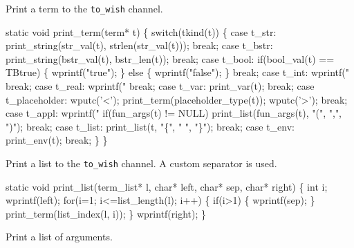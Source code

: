 

Print a term to the {\tt to\_wish} channel.

\nwenddocs{}\endmoddef\let\nwnotused=\nwoutput{}
static void print_term(term* t)
\{
   switch(tkind(t))
   \{
      case t_str:
         print_string(str_val(t), strlen(str_val(t)));
         break;
      case t_bstr:
         print_string(bstr_val(t), bstr_len(t));
         break;
      case t_bool:
         if(bool_val(t) == TBtrue) \{
            wprintf("true");
         \} else \{
            wprintf("false");
         \}
         break;
      case t_int:
         wprintf("%
         break;
      case t_real:
         wprintf("%
         break;
      case t_var:
         print_var(t);
         break;
      case t_placeholder:
         wputc('<');
         print_term(placeholder_type(t));
         wputc('>');
         break;
      case t_appl:
         wprintf("%
         if(fun_args(t) != NULL)
            print_list(fun_args(t), "(", ",", ")");
         break;
      case t_list:
         print_list(t, "\{", " ", "\}");
         break;
      case t_env:
         print_env(t);
         break;
   \}
\}
\nwendcode{}\nwdocspar


Print a list to the {\tt to\_wish} channel. A custom separator is used.

\nwenddocs{}\endmoddef\let\nwnotused=\nwoutput{}
static void print_list(term_list* l, char* left, char* sep, char* right)
\{
   int i;
   wprintf(left);
   for(i=1; i<=list_length(l); i++) \{
      if(i>1) \{
         wprintf(sep);
      \}
      print_term(list_index(l, i));
   \}
   wprintf(right);
\}
\nwendcode{}\nwdocspar


Print a list of arguments.

